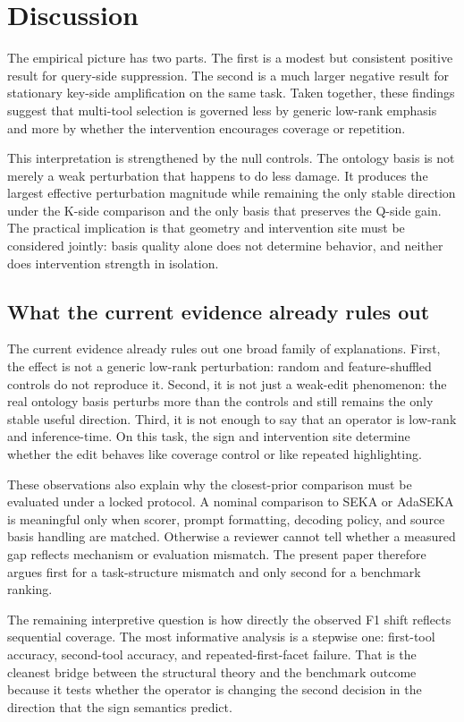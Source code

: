 \section{Discussion}

The empirical picture has two parts. The first is a modest but consistent positive result for query-side suppression. The second is a much larger negative result for stationary key-side amplification on the same task. Taken together, these findings suggest that multi-tool selection is governed less by generic low-rank emphasis and more by whether the intervention encourages coverage or repetition.

This interpretation is strengthened by the null controls. The ontology basis is not merely a weak perturbation that happens to do less damage. It produces the largest effective perturbation magnitude while remaining the only stable direction under the K-side comparison and the only basis that preserves the Q-side gain. The practical implication is that geometry and intervention site must be considered jointly: basis quality alone does not determine behavior, and neither does intervention strength in isolation.

\subsection{What the current evidence already rules out}

The current evidence already rules out one broad family of explanations. First, the effect is not a generic low-rank perturbation: random and feature-shuffled controls do not reproduce it. Second, it is not just a weak-edit phenomenon: the real ontology basis perturbs more than the controls and still remains the only stable useful direction. Third, it is not enough to say that an operator is low-rank and inference-time. On this task, the sign and intervention site determine whether the edit behaves like coverage control or like repeated highlighting.

These observations also explain why the closest-prior comparison must be evaluated under a locked protocol. A nominal comparison to SEKA or AdaSEKA is meaningful only when scorer, prompt formatting, decoding policy, and source basis handling are matched. Otherwise a reviewer cannot tell whether a measured gap reflects mechanism or evaluation mismatch. The present paper therefore argues first for a task-structure mismatch and only second for a benchmark ranking.

The remaining interpretive question is how directly the observed F1 shift reflects sequential coverage. The most informative analysis is a stepwise one: first-tool accuracy, second-tool accuracy, and repeated-first-facet failure. That is the cleanest bridge between the structural theory and the benchmark outcome because it tests whether the operator is changing the second decision in the direction that the sign semantics predict.
